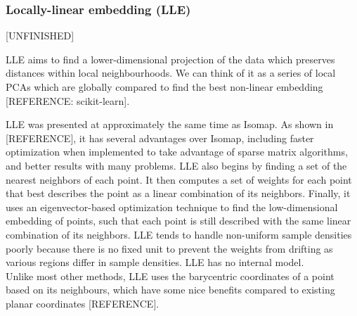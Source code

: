 \documentclass[journal, a4paper]{IEEEtran}
\begin{document}
\hfill
\subsubsection{Locally-linear embedding (LLE)}
[UNFINISHED]

LLE aims to find a lower-dimensional projection of the data which preserves distances within local neighbourhoods. We can think of it as a series of local PCAs which are globally compared to find the best non-linear embedding [REFERENCE: scikit-learn].



%


LLE was presented at approximately the same time as Isomap. 
As shown in [REFERENCE], it has several advantages over Isomap, including faster optimization when implemented to take advantage of sparse matrix algorithms, and better results with many problems. LLE also begins by finding a set of the nearest neighbors of each point. It then computes a set of weights for each point that best describes the point as a linear combination of its neighbors. Finally, it uses an eigenvector-based optimization technique to find the low-dimensional embedding of points, such that each point is still described with the same linear combination of its neighbors. LLE tends to handle non-uniform sample densities poorly because there is no fixed unit to prevent the weights from drifting as various regions differ in sample densities. LLE has no internal model.\\
Unlike most other methods, LLE uses the barycentric coordinates of a point based on its neighbours, which have some nice benefits compared to existing planar coordinates [REFERENCE].
\end{document}
